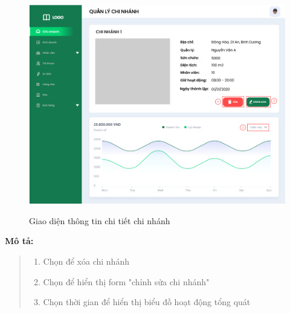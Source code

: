                 \begin{figure}[!htp]
                    \centering
                    \includegraphics[width=12cm]{img/UI/admin/branch_detail.png}
                    \label{21}
                    \newline
                    \caption{Giao diện thông tin chi tiết chi nhánh}
                \end{figure}
                \textbf{Mô tả:}  
                \begin{quote}
                    \begin{enumerate}
                        \item Chọn để xóa chi nhánh
                        \item Chọn để hiển thị form "chỉnh sửa chi nhánh"
                        \item Chọn thời gian để hiển thị biểu đồ hoạt động tổng quát
                    \end{enumerate}
                \end{quote}
    \newpage



